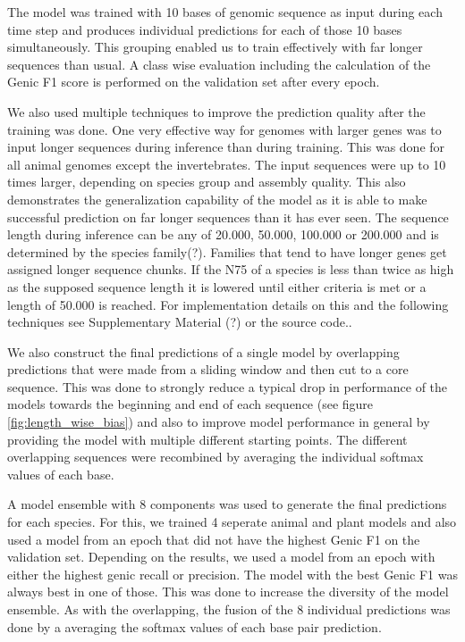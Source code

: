 \documentclass{bioinfo}
\begin{document}
\begin{methods}
The model was trained with 10 bases of genomic sequence as input during each time step and produces individual predictions for each of those 10 bases simultaneously. This grouping enabled us to train effectively with far longer sequences than usual. A class wise evaluation including the calculation of the Genic F1 score is performed on the validation set after every epoch.

We also used multiple techniques to improve the prediction quality after the training was done. One very effective way for genomes with larger genes was to input longer sequences during inference than during training. This was done for all animal genomes except the invertebrates. The input sequences were up to 10 times larger, depending on species group and assembly quality. This also demonstrates the generalization capability of the model as it is able to make successful prediction on far longer sequences than it has ever seen. The sequence length during inference can be any of 20.000, 50.000, 100.000 or 200.000 and is determined by the species family(?). Families that tend to have longer genes get assigned longer sequence chunks. If the N75 of a species is less than twice as high as the supposed sequence length it is lowered until either criteria is met or a length of 50.000 is reached. For implementation details on this and the following techniques see Supplementary Material (?) or the source code.. 
	
We also construct the final predictions of a single model by overlapping predictions that were made from a sliding window and then cut to a core sequence. This was done to strongly reduce a typical drop in performance of the models towards the beginning and end of each sequence (see figure \ref{fig:length_wise_bias}) and also to improve model performance in general by providing the model with multiple different starting points. The different overlapping sequences were recombined by averaging the individual softmax values of each base. 

A model ensemble with 8 components was used to generate the final predictions for each species. For this, we trained 4 seperate animal and plant models and also used a model from an epoch that did not have the highest Genic F1 on the validation set. Depending on the results, we used a model from an epoch with either the highest genic recall or precision. The model with the best Genic F1 was always best in one of those. This was done to increase the diversity of the model ensemble. As with the overlapping, the fusion of the 8 individual predictions was done by a averaging the softmax values of each base pair prediction.


\end{methods}
\end{document}
